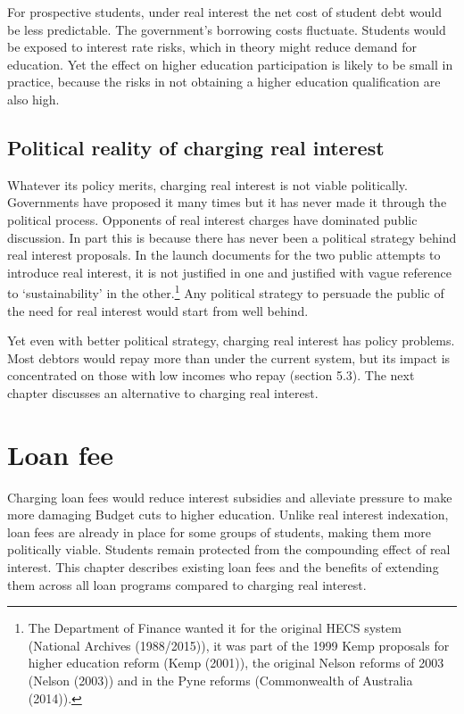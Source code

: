 \documentclass[embargoed]{grattan}
\begin{document}
For prospective students, under real interest the net cost of student debt would be less predictable. The government's borrowing costs fluctuate. Students would be exposed to interest rate risks, which in theory might reduce demand for education. Yet the effect on higher education participation is likely to be small in practice, because the risks in not obtaining a higher education qualification are also high.

\section{Political reality of charging real interest}\label{political-reality-of-charging-real-interest}

Whatever its policy merits, charging real interest is not viable politically. Governments have proposed it many times but it has never made it through the political process. Opponents of real interest charges have dominated public discussion. In part this is because there has never been a political strategy behind real interest proposals. In the launch documents for the two public attempts to introduce real interest, it is not justified in one and justified with vague reference to `sustainability' in the other.\footnote{The Department of Finance wanted it for the original HECS system (National Archives (1988/2015)), it was part of the 1999 Kemp proposals for higher education reform (Kemp (2001)), the original Nelson reforms of 2003 (Nelson (2003)) and in the Pyne reforms (Commonwealth of Australia (2014)).} Any political strategy to persuade the public of the need for real interest would start from well behind.

Yet even with better political strategy, charging real interest has policy problems. Most debtors would repay more than under the current system, but its impact is concentrated on those with low incomes who repay (section 5.3). The next chapter discusses an alternative to charging real interest.

\chapter{Loan fee}\label{chap:loan-fee}

Charging loan fees would reduce interest subsidies and alleviate pressure to make more damaging Budget cuts to higher education. Unlike real interest indexation, loan fees are already in place for some groups of students, making them more politically viable. Students remain protected from the compounding effect of real interest. This chapter describes existing loan fees and the benefits of extending them across all loan programs compared to charging real interest.
\end{document}
